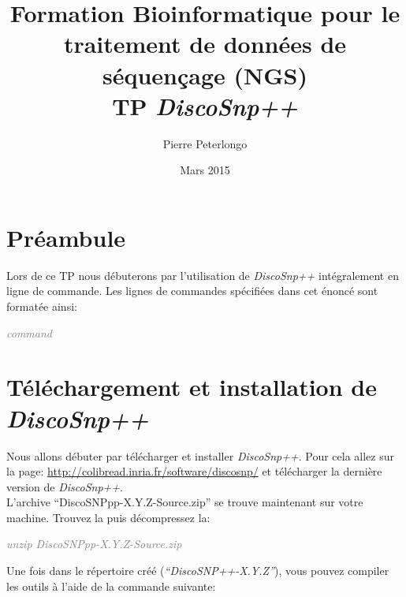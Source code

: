 
\usepackage{array}
\usepackage{url}
\usepackage{moreverb}
\usepackage{verbatim}
\usepackage[utf8]{inputenc}
\usepackage[T1]{fontenc}
\usepackage{xcolor}
\usepackage{xspace}
\newcommand{\discopp}{{\it DiscoSnp++}\xspace}
\newcommand{\code}[1]{\begin{center} \textcolor{gray}{{\emph{#1}}} \end{center}} 
\newcommand{\sligne}{\begin{center} \begin{tabular}{c}~~~~~~~~~~~~~~~~~~~~~~~~~~~~~~~~~~~~~~\\ \hline\\\end{tabular}\end{center}}


\title{Formation Bioinformatique pour le traitement de données de séquençage (NGS)\\
TP \discopp}
\date{Mars 2015} 
\author{Pierre Peterlongo}
\maketitle
\textbf{}

\section*{Préambule} %
\label{sec:preambule}
Lors de ce TP nous débuterons par l'utilisation de \discopp intégralement en ligne de commande. Les lignes de commandes spécifiées dans cet énoncé sont formatée ainsi:
\code{command}

\section*{Téléchargement et installation de \discopp} %
\label{sec:telechargement_et_installation}
Nous allons débuter par télécharger et installer \discopp. Pour cela allez sur la page: \url{http://colibread.inria.fr/software/discosnp/} et télécharger la dernière version de \discopp. \\

L'archive ``DiscoSNPpp-X.Y.Z-Source.zip'' se trouve maintenant sur votre machine. Trouvez la puis décompressez la:


\code{unzip DiscoSNPpp-X.Y.Z-Source.zip}

Une fois dans le répertoire créé (\emph{``DiscoSNP++-X.Y.Z''}), vous pouvez compiler les outils à l'aide de la commande suivante:


